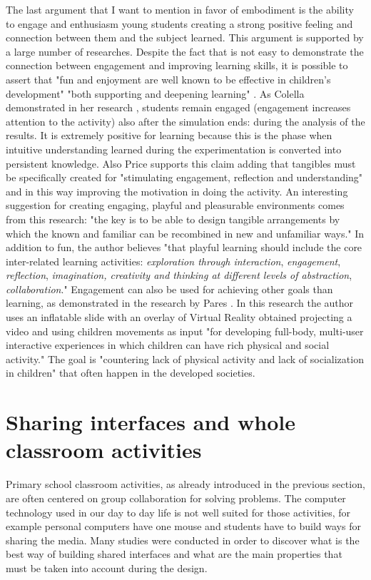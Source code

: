 The last argument that I want to mention in favor of embodiment is the ability to engage and enthusiasm young students creating a strong positive feeling and connection between them and the subject learned. This argument is supported by a large number of researches. Despite the fact that is not easy to demonstrate the connection between engagement and improving learning skills, it is possible to assert that "fun and enjoyment are well known to be effective in children’s development" \cite{Clements:playing} "both supporting and deepening learning" \cite{kafai:constructionism}. As Colella demonstrated in her research \cite{colella:participatory}, students remain engaged (engagement increases attention to the activity) also after the simulation ends: during the analysis of the results. It is extremely positive for learning because this is the phase when intuitive understanding learned during the experimentation is converted into persistent knowledge. Also Price \cite{price:snark} supports this claim adding that tangibles must be specifically created for "stimulating engagement, reflection and understanding" \cite{price:snark} and in this way improving the motivation in doing the activity. An interesting suggestion for creating engaging, playful and pleasurable environments comes from this research: "the key is to be able to design tangible arrangements by which the known and familiar can be recombined in new and unfamiliar ways." \cite{price:snark} In addition to fun, the author believes "that playful learning should include the core inter-related learning activities: \textit{exploration through interaction}, \textit{engagement}, \textit{reflection}, \textit{imagination, creativity and thinking at different levels of abstraction}, \textit{collaboration}." \cite{price:snark} Engagement can also be used for achieving other goals than learning, as demonstrated in the research by Pares \cite{soler:novel}. In this research the author uses an inflatable slide with an overlay of Virtual Reality obtained projecting a video and using children movements as input "for developing full-body, multi-user interactive experiences in which children can have rich physical and social activity." \cite{soler:novel} The goal is "countering lack of physical activity and lack of socialization in children" \cite{soler:novel} that often happen in the developed societies.

\section{Sharing interfaces and whole classroom activities}
Primary school classroom activities, as already introduced in the previous section, are often centered on group collaboration for solving problems. The computer technology used in our day to day life is not well suited for those activities, for example personal computers have one mouse and students have to build ways for sharing the media. Many studies were conducted in order to discover what is the best way of building shared interfaces and what are the main properties that must be taken into account during the design.

